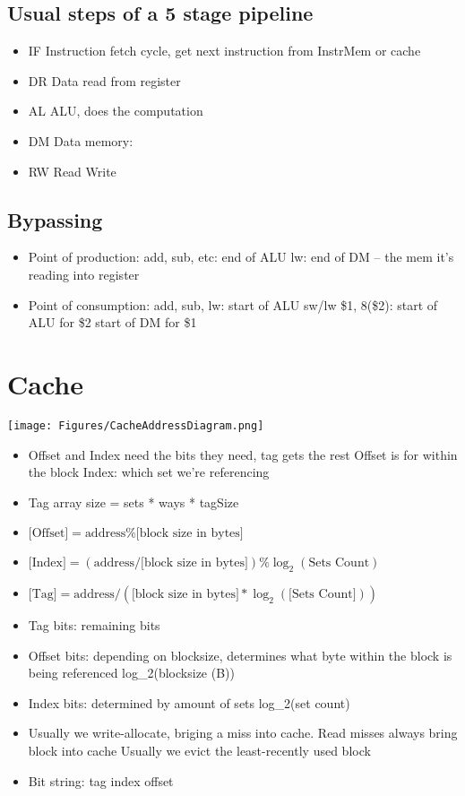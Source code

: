 \documentclass[letterpaper,landscape]{article}
\begin{document}
\begin{multicols}{2}
\subsection*{Usual steps of a 5 stage pipeline}
\begin{itemize}
	\item IF Instruction fetch \- cycle, get next instruction from InstrMem or cache
	\item DR Data read from register
	\item AL ALU, does the computation
	\item DM Data memory: 
	\item RW Read Write
\end{itemize}
\subsection*{Bypassing}
\begin{itemize}
	\item Point of production:
	\subitem add, sub, etc: end of ALU
	\subitem lw: end of DM -- the mem it's reading into register
	\item Point of consumption:
	\subitem add, sub, lw: start of ALU
	\subitem sw/lw \$1, 8(\$2):
	\subsubitem start of ALU for \$2
	\subsubitem start of DM for \$1
\end{itemize}


\section{Cache}
\begin{Figure}
	\centering
	\texttt{[image: Figures/CacheAddressDiagram.png]}
\end{Figure}

\begin{itemize}
	\item Offset and Index need the bits they need, tag gets the rest
	\subitem Offset is for within the block
	\subitem Index: which set we're referencing
	\item Tag array size = sets * ways * tagSize
	\item $\text{[Offset]} = \text{address} \% \text{[block size in bytes]}$
	\item $\text{[Index]} = (\text{address} / \text{[block size in bytes]}) \% \log_2(\text{Sets Count})$
	\item $\text{[Tag]} = \text{address} / (\text{[block size in bytes]} * \log_2(\text{[Sets Count]}))$
	\item Tag bits: remaining bits
	\item Offset bits: depending on blocksize, determines what byte within the block is being referenced log_2(blocksize (B))
	\item Index bits: determined by amount of sets log_2(set count)
	\item Usually we write-allocate, briging a miss into cache. Read misses always bring block into cache
	\subitem Usually we evict the least-recently used block
	\item Bit string: tag index offset
\end{itemize}



\end{multicols}
\end{document}
